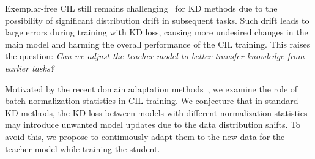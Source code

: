 \documentclass[10pt,twocolumn,letterpaper]{article}
\newcommand\bt[1]{{\color{blue} {\bf BT:} #1}}
\newcommand\todo[1]{{\color{red} [\bf TODO: #1]}}
\begin{document}
Exemplar-free CIL still remains challenging~\cite{smith2023closer} for KD methods due to the possibility of significant distribution drift in subsequent tasks. Such drift leads to large errors during training with KD loss, causing more undesired changes in the main model and harming the overall performance of the CIL training. This raises the question: \textit{Can we adjust the teacher model to better transfer knowledge from earlier tasks?}



Motivated by the recent domain adaptation methods~\cite{TENT,steffen2020shiftadapt}, we examine the role of batch normalization statistics in CIL training. We conjecture that in standard KD methods, the KD loss between models with different normalization statistics may introduce unwanted model updates due to the data distribution shifts. To avoid this, we propose to continuously adapt them to the new data for the teacher model while training the student.
\end{document}

